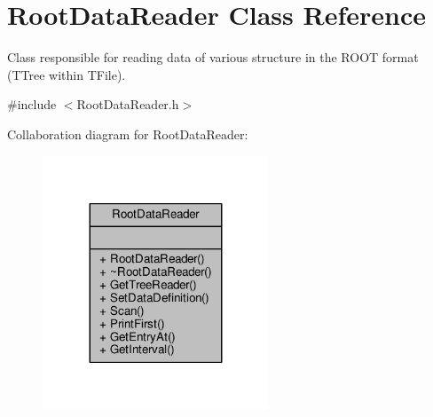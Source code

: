 \hypertarget{classRootDataReader}{\section{Root\+Data\+Reader Class Reference}
\label{classRootDataReader}
}


Class responsible for reading data of various structure in the R\+O\+O\+T format (T\+Tree within T\+File).  




{\ttfamily \#include $<$Root\+Data\+Reader.\+h$>$}



Collaboration diagram for Root\+Data\+Reader\+:\nopagebreak
\begin{figure}[H]
\begin{center}
\leavevmode
\includegraphics[width=191pt]{classRootDataReader__coll__graph}
\end{center}
\end{figure}
